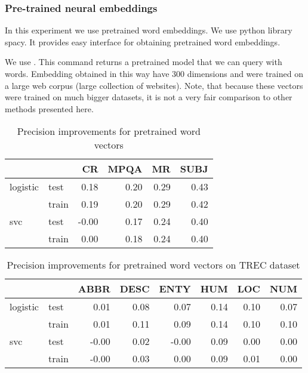     \subsubsection{Pre-trained neural embeddings}    
    
    In this experiment we use pretrained word embeddings. 
    We use python library spacy.
    It provides easy interface for obtaining pretrained word embeddings.
    
    We use .
    This command returns a pretrained model that we can query with words. 
    Embedding obtained in this way have $300$ dimensions and were trained on a large web corpus (large collection of websites). 
    Note, that because these vectors were trained on much bigger datasets, it is not a very fair comparison to other methods presented here.

\begin{table}[h]
\begin{center}

\begin{tabular}{llrrrr}
\toprule
 &&CR &MPQA &MR &SUBJ \\
\midrule
logistic & test & 0.18 & 0.20 & 0.29 & 0.43 \\
 & train & 0.19 & 0.20 & 0.29 & 0.42 \\
svc & test &-0.00 & 0.17 & 0.24 & 0.40 \\
 & train & 0.00 & 0.18 & 0.24 & 0.40 \\
\bottomrule
\end{tabular}

\caption[Precision improvements for pretrained word vectors]{Precision improvements for pretrained word vectors}
\label{tab:res:pretrainedwordvec}
\end{center}
\end{table}



\begin{table}[H]
\begin{center}

\begin{tabular}{llrrrrrr}
\toprule
 &&ABBR &DESC &ENTY &HUM &LOC &NUM \\
\midrule
logistic & test &0.01 &0.08 &0.07 & 0.14 & 0.10 & 0.07 \\
 & train &0.01 &0.11 &0.09 & 0.14 & 0.10 & 0.10 \\
svc & test & -0.00 &0.02 & -0.00 & 0.09 & 0.00 & 0.00 \\
 & train & -0.00 &0.03 &0.00 & 0.09 & 0.01 & 0.00 \\
\bottomrule
\end{tabular}

\caption[Precision improvements for pretrained word vectors on TREC dataset]{Precision improvements for pretrained word vectors on TREC dataset}
\label{tab:res:pretrainedwordvec:trec}
\end{center}
\end{table}

